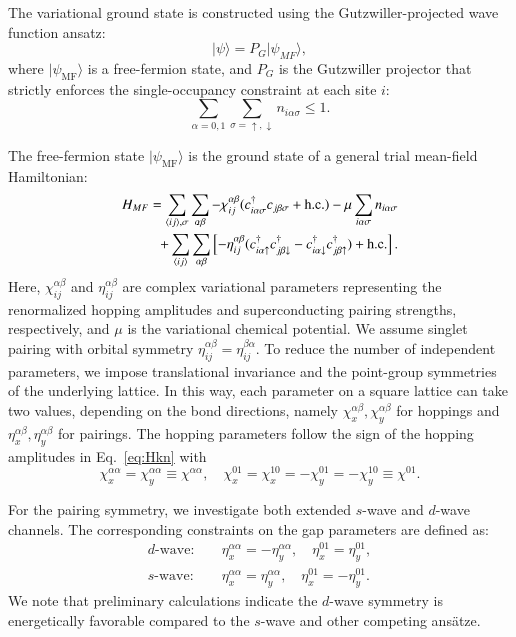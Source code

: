 \documentclass[reprint,superscriptaddress,amsmath,amssymb,aps,twocolumn]{revtex4-1}
\begin{document}
The variational ground state is constructed using the Gutzwiller-projected wave function ansatz:
\begin{equation}
    |\psi\rangle=P_G|\psi_{MF}\rangle,
\end{equation}
where $|\psi_{\text{MF}}\rangle$ is a free-fermion state, and $P_G$ is the Gutzwiller projector that strictly enforces the single-occupancy constraint at each site $i$: $$\sum_{\alpha=0,1}\sum_{\sigma=\uparrow,\downarrow} n_{i\alpha\sigma} \le 1.$$         

The free-fermion state $|\psi_{\text{MF}}\rangle$ is the ground state of a general trial mean-field Hamiltonian:
\begin{align}
    H_{MF}=\sum_{\langle ij\rangle,\sigma}\sum_{\alpha\beta} -\chi_{ij}^{\alpha\beta} (c_{i\alpha\sigma}^\dagger c_{j\beta\sigma} + \text{h.c.})-\mu\sum_{i\alpha\sigma} n_{i\alpha\sigma} \notag\\
    + \sum_{\langle ij\rangle}\sum_{\alpha\beta}\left[-\eta_{ij}^{\alpha\beta}(c_{i\alpha\uparrow}^\dagger c_{j\beta\downarrow}^\dagger - c_{i\alpha\downarrow}^\dagger c_{j\beta\uparrow}^\dagger)+\text{h.c.}\right].
    \label{eq:HMF}
\end{align}
Here, $\chi_{ij}^{\alpha\beta}$ and $\eta_{ij}^{\alpha\beta}$ are complex variational parameters representing the renormalized hopping amplitudes and superconducting pairing strengths, respectively, and $\mu$ is the variational chemical potential. We assume singlet pairing with orbital symmetry $\eta_{ij}^{\alpha\beta} = \eta_{ij}^{\beta\alpha}$.
To reduce the number of independent parameters, we impose translational invariance and the point-group symmetries of the underlying lattice. In this way, each parameter on a square lattice can take two values, depending on the bond directions, namely $\chi_x^{\alpha\beta}, \chi_y^{\alpha\beta}$ for hoppings and $\eta_x^{\alpha\beta}, \eta_y^{\alpha\beta}$ for pairings. The hopping parameters follow the sign of the hopping amplitudes in Eq.~\eqref{eq:Hkn} with
\begin{equation}
\chi_x^{\alpha\alpha}=\chi_y^{\alpha\alpha}\equiv\chi^{\alpha\alpha},\quad \chi_{x}^{01}=\chi_{x}^{10}=-\chi_{y}^{01}=-\chi_{y}^{10}\equiv\chi^{01}.
\end{equation}

For the pairing symmetry, we investigate both extended $s$-wave and $d$-wave channels. The corresponding constraints on the gap parameters are defined as:
\begin{align}
    d\text{-wave}: & \quad \eta_{x}^{\alpha\alpha} = -\eta_y^{\alpha\alpha}, \quad \eta_{x}^{01} = \eta_y^{01}, \\
    s\text{-wave}: & \quad \eta_{x}^{\alpha\alpha} = \eta_y^{\alpha\alpha}, \quad \eta_{x}^{01} = -\eta_y^{01}.
\end{align}
We note that preliminary calculations indicate the $d$-wave symmetry is energetically favorable compared to the $s$-wave and other competing ans\"atze.
\end{document}
